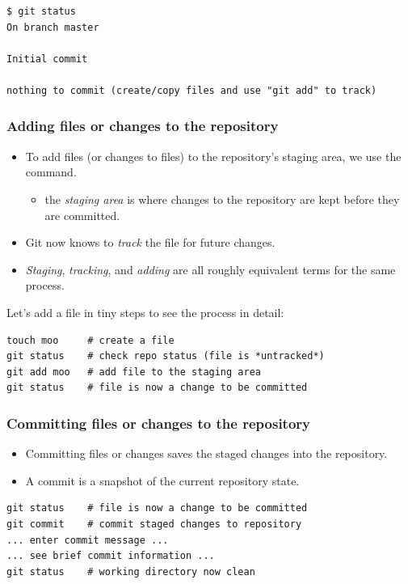\documentclass{git_course}
\begin{document}
\begin{frame}[fragile]
\begin{lstlisting}[basicstyle=\tiny\ttfamily]
$ git status
On branch master

Initial commit

nothing to commit (create/copy files and use "git add" to track)
\end{lstlisting}
\end{frame}


\begin{frame}[fragile]
\frametitle{Adding files or changes to the repository}
\begin{itemize}
    \item To add files (or changes to files) to the repository's
        staging area, we use the  command.
    \begin{itemize}
        \item the \emph{staging area} is where changes to the repository
            are kept before they are committed.
    \end{itemize}
    \item Git now knows to \emph{track} the file for future changes.
    \item \emph{Staging}, \emph{tracking}, and \emph{adding} are all
        roughly equivalent terms for the same process.
\end{itemize}

Let's add a file in tiny steps to see the process in detail:
\begin{lstlisting}
touch moo     # create a file
git status    # check repo status (file is *untracked*)
git add moo   # add file to the staging area
git status    # file is now a change to be committed
\end{lstlisting}
\end{frame}


\begin{frame}[fragile]
\frametitle{Committing files or changes to the repository}
\begin{itemize}
    \item Committing files or changes saves the staged changes into the
        repository.
    \item A commit is a snapshot of the current repository state.
\end{itemize}
\begin{lstlisting}
git status    # file is now a change to be committed
git commit    # commit staged changes to repository
... enter commit message ...
... see brief commit information ...
git status    # working directory now clean
\end{lstlisting}
\end{frame}
\end{document}
